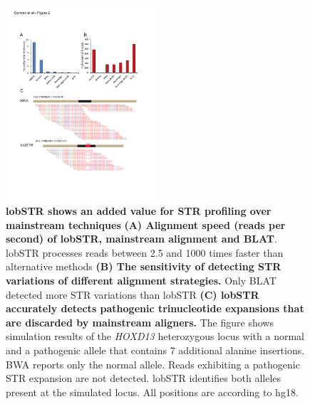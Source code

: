 \begin{figure}[h!]
\centering
\label{fig:lobfig2}
\includegraphics[width=0.5\textwidth]{Figures/Chapter2/Fig2.pdf}
\caption{\textbf{lobSTR shows an added value for STR profiling over mainstream techniques} \textbf{(A) Alignment speed (reads per second) of lobSTR, mainstream alignment and BLAT}. lobSTR processes reads between 2.5 and 1000 times faster than alternative methods \textbf{(B) The sensitivity of detecting STR variations of different alignment strategies.} Only BLAT detected more STR variations than lobSTR \textbf{(C) lobSTR accurately detects pathogenic trinucleotide expansions that are discarded by mainstream aligners.} The figure shows simulation results of the \emph{HOXD13} heterozygous locus with a normal and a pathogenic allele that contains 7 additional alanine insertions. BWA reports only the normal allele. Reads exhibiting a pathogenic STR expansion are not detected. lobSTR identifies both alleles present at the simulated locus. All positions are according to hg18.}
\end{figure}


